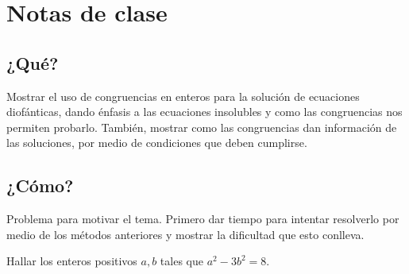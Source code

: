 \newpage
\section{Notas de clase}

\subsection{¿Qué?}

Mostrar el uso de congruencias en enteros para la solución de ecuaciones diofánticas, dando énfasis a las ecuaciones insolubles
y como las congruencias nos permiten probarlo.
También, mostrar como las congruencias dan información de las soluciones, por medio de condiciones que deben cumplirse.

\subsection{¿Cómo?}

Problema para motivar el tema.
Primero dar tiempo para intentar resolverlo por medio de los métodos anteriores y mostrar la dificultad que esto conlleva.

\begin{activity}[Ejercicio 3][10 min]
    Hallar los enteros positivos $a,b$ tales que $a^2 - 3b^2 = 8$.
\end{activity}


